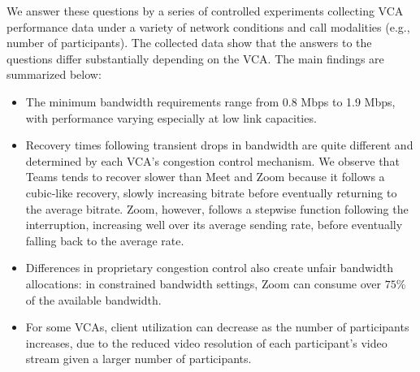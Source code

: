 We answer these questions by a series of controlled experiments collecting VCA performance data under a variety of network conditions and call modalities (e.g., number of participants). The collected data show that the answers to the questions differ substantially depending on the VCA. The main findings are summarized below:%
\begin{itemize}[noitemsep]
    \item The minimum bandwidth requirements range from 0.8 Mbps to 1.9 Mbps, with performance varying especially at low link capacities. 
    \item Recovery times following transient drops in bandwidth are quite different and determined by each VCA's congestion control mechanism. We observe that Teams tends to recover slower than Meet and Zoom because it follows a cubic-like recovery, slowly increasing bitrate before eventually returning to the average bitrate. Zoom, however, follows a stepwise function following the interruption, increasing well over its average sending rate, before eventually falling back to the average rate.
    \item Differences in proprietary congestion control also create unfair bandwidth allocations: in constrained bandwidth settings, Zoom can consume over $75\%$ of the available bandwidth.
    \item For some VCAs, client utilization can decrease as the number of participants increases, due to the reduced video resolution of each participant's video stream given a larger number of participants.
\end{itemize}





